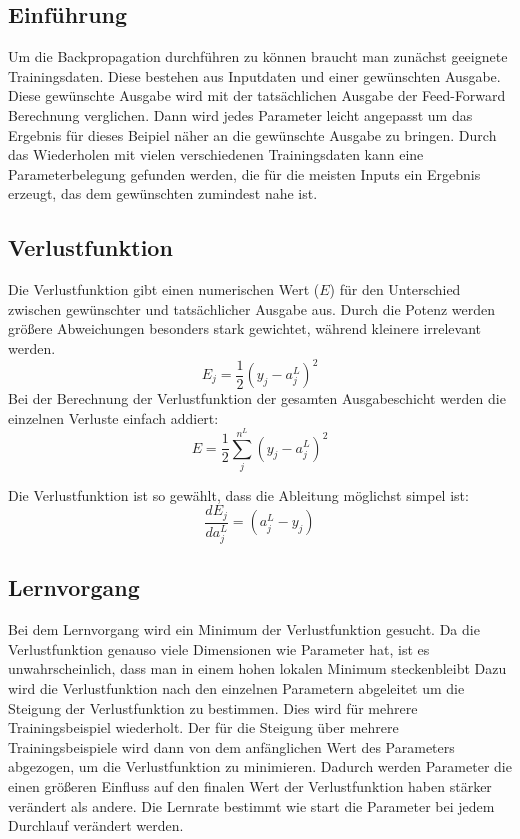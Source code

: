 \documentclass{article}
\begin{document}
\subsection{Einführung}
Um die Backpropagation durchführen zu können braucht man zunächst geeignete Trainingsdaten.
Diese bestehen aus Inputdaten und einer gewünschten Ausgabe.
Diese gewünschte Ausgabe wird mit der tatsächlichen Ausgabe der Feed-Forward Berechnung verglichen.
Dann wird jedes Parameter leicht angepasst um das Ergebnis für dieses Beipiel näher an die gewünschte Ausgabe zu bringen.
Durch das Wiederholen mit vielen verschiedenen Trainingsdaten kann eine Parameterbelegung gefunden werden, die für die meisten Inputs ein Ergebnis erzeugt, das dem gewünschten zumindest nahe ist.

\subsection{Verlustfunktion}
Die Verlustfunktion gibt einen numerischen Wert ($E$) für den Unterschied zwischen gewünschter und tatsächlicher Ausgabe aus.
Durch die Potenz werden größere Abweichungen besonders stark gewichtet, während kleinere irrelevant werden.
\[ E_j = \frac{1}{2}(y_j - a_j^L)^2 \]
Bei der Berechnung der Verlustfunktion der gesamten Ausgabeschicht werden die einzelnen Verluste einfach addiert:
\[ E = \frac{1}{2}\sum_{j}^{n^L} (y_j - a_j^L)^2 \]

Die Verlustfunktion ist so gewählt, dass die Ableitung möglichst simpel ist:
\[ \frac{dE_j}{da_{j}^L}  = (a_j^L - y_j) \]


\subsection{Lernvorgang}
Bei dem Lernvorgang wird ein Minimum der Verlustfunktion gesucht.
Da die Verlustfunktion genauso viele Dimensionen wie Parameter hat, ist es unwahrscheinlich, dass man in einem hohen lokalen Minimum \glqq steckenbleibt\grqq{}
Dazu wird die Verlustfunktion nach den einzelnen Parametern abgeleitet um die Steigung der Verlustfunktion zu bestimmen.
Dies wird für mehrere Trainingsbeispiel wiederholt.
Der für die Steigung über mehrere Trainingsbeispiele wird dann von dem anfänglichen Wert des Parameters abgezogen, um die Verlustfunktion zu minimieren.
Dadurch werden Parameter die einen größeren Einfluss auf den finalen Wert der Verlustfunktion haben stärker verändert als andere.
Die Lernrate bestimmt wie start die Parameter bei jedem Durchlauf verändert werden.
\end{document}
